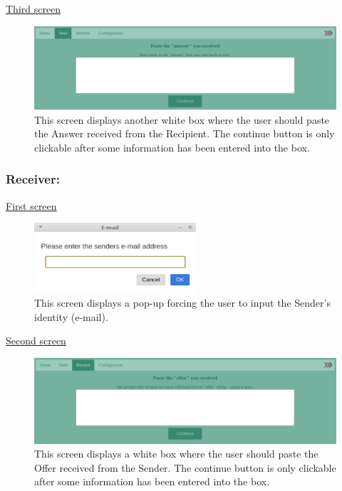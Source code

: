 %
\noindent
\underline{Third screen}
\begin{figure}[H]
  \centering
  \includegraphics[width=\textwidth]{Figures/SL/sender_answer}
  \decoRule
  \caption[Serverless mode: Input Answer screen]{This screen displays another white box where the user should paste the Answer received from the Recipient. The continue button is only clickable after some information has been entered into the box.}
  \label{fig:serv_s_ans}
\end{figure}
\pagebreak
%
\subsubsection*{Receiver:}

%
\noindent
\underline{First screen}
\begin{figure}[H]
  \centering
  \includegraphics[width=60mm]{Figures/SL/receiver_pop_up}
  \decoRule
  \caption[Serverless mode: Register Sender screen]{This screen displays a pop-up forcing the user to input the Sender's identity (e-mail).}
  \label{fig:serv_r_pop}
\end{figure}

%
\noindent
\underline{Second screen}
\begin{figure}[H]
  \centering
  \includegraphics[width=\textwidth]{Figures/SL/receiver_offer}
  \decoRule
  \caption[Serverless mode: Input Offer screen]{This screen displays a white box where the user should paste the Offer received from the Sender. The continue button is only clickable after some information has been entered into the box.}
  \label{fig:serv_r_off}
\end{figure}

